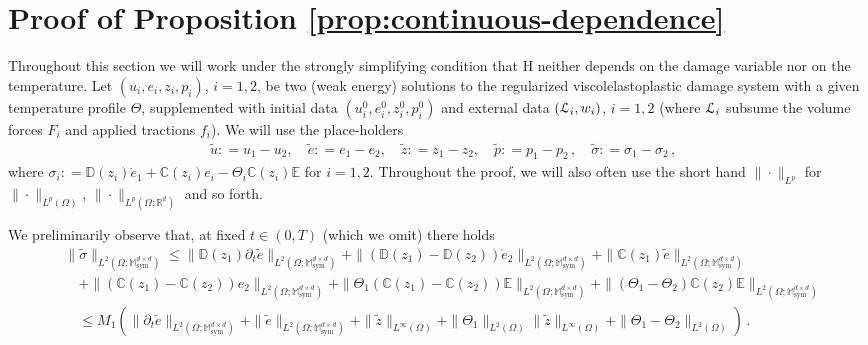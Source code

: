 \documentclass[a4paper,10pt,reqno]{amsart}
\numberwithin{equation}{section}
\newcommand{\bbM}{\mathbb{M}}
\newcommand{\R}{\mathbb{R}}
\numberwithin{equation}{section}
\newcommand{\bbC}{\mathbb{C}}
\newcommand{\bbD}{\mathbb{D}}
\newcommand{\bbE}{\mathbb{E}}
\newcommand{\mt}{\bbM}
\newcommand{\sym}{\mathrm{sym}}
\newcommand{\EEE}{\color{black}}
\newcommand{\MMM}{\color{black}}%
\begin{document}
\section{Proof of Proposition \ref{prop:continuous-dependence}} 
\label{s:6}
\noindent
\MMM Throughout this section we will work under the strongly simplifying condition that $\mathrm{H}$ neither depends on the damage variable nor on the temperature. \EEE 
Let $(u_i,e_i,z_i,p_i)$, $i=1,2$, be two (weak energy) solutions 
to the regularized viscolelastoplastic damage system  with a given temperature profile $\Theta$, supplemented with  initial data
$(u_i^0,e_i^0, z_i^0, p_i^0)$ and external data $({\mathcal L}_i,w_i)$, $i=1,2$ (where ${\mathcal L}_i$ subsume the volume forces  $F_i$ and applied tractions $f_i$). 
 We will use the place-holders
\[
\begin{aligned}
&
\tilde{u}: = u_1-u_2, \quad \tilde{e}: = e_1-e_2, \quad \tilde{z}: = z_1-z_2,  \quad \tilde{p}: = p_1-p_2\,,\quad \tilde{\sigma}: = \sigma_1-\sigma_2\,,
\end{aligned}
\]
where  $\sigma_i: = \bbD(z_i) \dot{e}_1 + \bbC(z_i) e_i -\Theta_i \bbC(z_i) \bbE$ for $i=1,2$. Throughout the proof, we will also often use the short hand $\| \cdot\|_{L^p}$ for  $\| \cdot\|_{L^p(\Omega)}$,  $\| \cdot\|_{L^p(\Omega;\R^d)}$ and so forth.  
\par
We preliminarily observe that, at fixed $t\in (0,T)$ (which we omit) there holds 
\begin{equation}
\label{prelim-sigma}
\begin{aligned}
&
\| \tilde{\sigma}\|_{L^2(\Omega;\mt_\sym^{d\times d})}    \leq \|  \bbD(z_1) \partial_t \tilde{e} \|_{L^2(\Omega;\mt_\sym^{d\times d})}
+ \| \left( \bbD(z_1){-} \bbD(z_2) \right) \dot{e}_2  \|_{L^2(\Omega;\mt_\sym^{d\times d})}
+  \| \bbC(z_1)  \tilde{e} \|_{L^2(\Omega;\mt_\sym^{d\times d})}
\\
&
\quad 
+ \| \left( \bbC(z_1){-} \bbC(z_2) \right) {e}_2  \|_{L^2(\Omega;\mt_\sym^{d\times d})}
+ \| \Theta_1 \left( \bbC(z_1){-} \bbC(z_2)\right) \bbE  \|_{L^2(\Omega;\mt_\sym^{d\times d})} 
+ \| (\Theta_1{-}\Theta_2) \bbC(z_2) \bbE  \|_{L^2(\Omega;\mt_\sym^{d\times d})} 
\\
& \quad  \leq 
M_1\left( 
\| \partial_t \tilde{e} \|_{L^2(\Omega;\mt_\sym^{d\times d})}+ \| \tilde{e} \|_{L^2(\Omega;\mt_\sym^{d\times d})}+
 \|\tilde{z}\|_{L^\infty(\Omega)}+
 \|\Theta_1\|_{L^2(\Omega)} \|\tilde{z}\|_{L^\infty(\Omega)}+
  \|\Theta_1{-}\Theta_2 \|_{L^2(\Omega)} \right)\,.
\end{aligned}
\end{equation}
\end{document}
